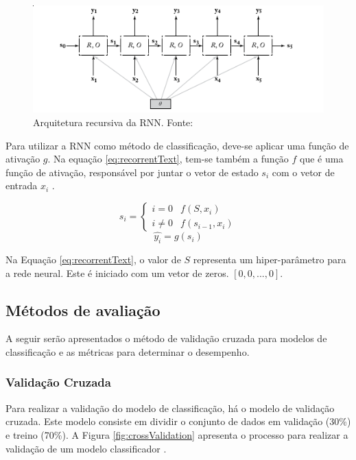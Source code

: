 \begin{figure}[h]
	\centering
	\includegraphics[keepaspectratio=true,scale=0.8]{figuras/rnnText}
	\caption[Arquitetura recursiva da RNN]{Arquitetura recursiva da RNN. Fonte: \cite[Página 166]{GOLDBERG2017}}
	\label{fig:rnnText}
\end{figure}

Para utilizar a RNN como método de classificação, deve-se aplicar uma função de ativação $g$. Na equação \ref{eq:recorrentText}, tem-se também a função $f$ que é uma função de ativação, responsável por juntar o vetor de estado $s_{i}$ com o vetor de entrada $x_{i}$ \cite{MIKOLOV2010}.

\begin{equation}
	\label{eq:recorrentText}
	s_{i} = 
    \begin{cases}
    	i = 0 & f(S, x_{i}) \\
        i \neq 0 & f(s_{i-1}, x_{i})
    \end{cases}
\end{equation}
\begin{equation*}
	\hat{y_{i}} = g(s_{i})
\end{equation*}

Na Equação \ref{eq:recorrentText}, o valor de $S$ representa um hiper-parâmetro para a rede neural. Este é iniciado com um vetor de zeros. $[0, 0, ..., 0]$.

\subsection{Métodos de avaliação}

A seguir serão apresentados o método de validação cruzada para modelos de classificação e as métricas para determinar o desempenho.

\subsubsection{Validação Cruzada}

Para realizar a validação do modelo de classificação, há o modelo de validação cruzada. Este modelo consiste em dividir o conjunto de dados em validação (30\%) e treino (70\%). A Figura \ref{fig:crossValidation} apresenta o processo para realizar a validação de um modelo classificador \cite{BRINK2015}.

